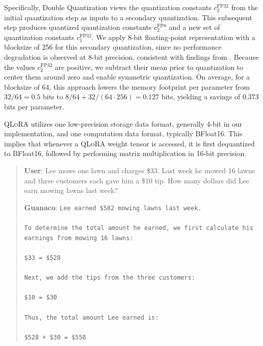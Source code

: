 Specifically, Double Quantization views the quantization constants $c_2^{\text{FP32}}$ from the initial quantization step as inputs to a secondary quantization. This subsequent step produces quantized quantization constants $c_2^{\text{FP8}}$ and a new set of quantization constants $c_1^{\text{FP32}}$. We apply 8-bit floating-point representation with a blocksize of 256 for this secondary quantization, since no performance degradation is observed at 8-bit precision, consistent with findings from \citet{dettmers2022case}. Because the values $c_2^{\text{FP32}}$ are positive, we subtract their mean prior to quantization to center them around zero and enable symmetric quantization. On average, for a blocksize of 64, this approach lowers the memory footprint per parameter from $32/64=0.5$ bits to $8/64 + 32/(64 \cdot 256) = 0.127$ bits, yielding a savings of 0.373 bits per parameter.

\textsc{QLoRA} utilizes one low-precision storage data format, generally 4-bit in our implementation, and one computation data format, typically BFloat16. This implies that whenever a \textsc{QLoRA} weight tensor is accessed, it is first dequantized to BFloat16, followed by performing matrix multiplication in 16-bit precision.

\begin{quote}
    \textbf{User}: Lee mows one lawn and charges \$33. Last week he mowed 16 lawns and three customers each gave him a \$10 tip. How many dollars did Lee earn mowing lawns last week?

    \textbf{Guanaco}: \texttt{Lee earned \$582 mowing lawns last week. \\ \\ To determine the total amount he earned, we first calculate his earnings from mowing 16 lawns: \\ \\  \$33  = \$528 \\ \\ Next, we add the tips from the three customers: \\  \\ \$10  = \$30 \\ \\ Thus, the total amount Lee earned is: \\ \\ \$528 + \$30 = \$558}
\end{quote}

